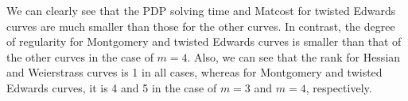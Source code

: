 

We can clearly see that the PDP solving time and Matcost for twisted
Edwards curves are much smaller than those for the other curves.
%
In contrast, the degree of regularity for Montgomery and twisted
Edwards curves is smaller than that of the other curves in the case of
$m=4$.
%
Also, we can see that the rank for Hessian and Weierstrass curves is 1
in all cases, whereas for Montgomery and twisted Edwards curves, it is
4 and 5 in the case of $m=3$ and $m=4$, respectively.
%








